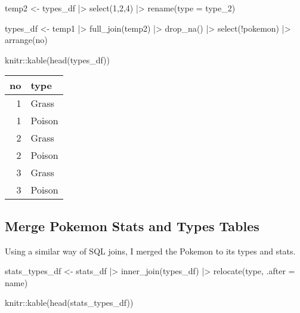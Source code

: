 \documentclass[
]{article}
\newenvironment{Shaded}{\begin{snugshade}}{\end{snugshade}}
\newcommand{\AttributeTok}[1]{\textcolor[rgb]{0.77,0.63,0.00}{#1}}
\newcommand{\DecValTok}[1]{\textcolor[rgb]{0.00,0.00,0.81}{#1}}
\newcommand{\FunctionTok}[1]{\textcolor[rgb]{0.00,0.00,0.00}{#1}}
\newcommand{\NormalTok}[1]{#1}
\newcommand{\OtherTok}[1]{\textcolor[rgb]{0.56,0.35,0.01}{#1}}
\newcommand{\SpecialCharTok}[1]{\textcolor[rgb]{0.00,0.00,0.00}{#1}}
\begin{document}
\begin{Shaded}
\begin{Highlighting}[]
\NormalTok{temp2 }\OtherTok{\textless{}{-}} 
\NormalTok{  types\_df }\SpecialCharTok{|\textgreater{}} 
  \FunctionTok{select}\NormalTok{(}\DecValTok{1}\NormalTok{,}\DecValTok{2}\NormalTok{,}\DecValTok{4}\NormalTok{) }\SpecialCharTok{|\textgreater{}} 
  \FunctionTok{rename}\NormalTok{(}\AttributeTok{type =}\NormalTok{ type\_2)}

\NormalTok{types\_df }\OtherTok{\textless{}{-}} 
\NormalTok{  temp1 }\SpecialCharTok{|\textgreater{}} 
  \FunctionTok{full\_join}\NormalTok{(temp2) }\SpecialCharTok{|\textgreater{}}
  \FunctionTok{drop\_na}\NormalTok{() }\SpecialCharTok{|\textgreater{}} 
  \FunctionTok{select}\NormalTok{(}\SpecialCharTok{!}\NormalTok{pokemon) }\SpecialCharTok{|\textgreater{}} 
  \FunctionTok{arrange}\NormalTok{(no)}

\NormalTok{knitr}\SpecialCharTok{::}\FunctionTok{kable}\NormalTok{(}\FunctionTok{head}\NormalTok{(types\_df))}
\end{Highlighting}
\end{Shaded}

\begin{longtable}[]{@{}rl@{}}
\toprule()
no & type \\
\midrule()
\endhead
1 & Grass \\
1 & Poison \\
2 & Grass \\
2 & Poison \\
3 & Grass \\
3 & Poison \\
\bottomrule()
\end{longtable}

\hypertarget{merge-pokemon-stats-and-types-tables}{%
\subsection{Merge Pokemon Stats and Types
Tables}\label{merge-pokemon-stats-and-types-tables}}

Using a similar way of SQL joins, I merged the Pokemon to its types and
stats.

\begin{Shaded}
\begin{Highlighting}[]
\NormalTok{stats\_types\_df }\OtherTok{\textless{}{-}}  
\NormalTok{  stats\_df }\SpecialCharTok{|\textgreater{}} 
  \FunctionTok{inner\_join}\NormalTok{(types\_df) }\SpecialCharTok{|\textgreater{}} 
  \FunctionTok{relocate}\NormalTok{(type, }\AttributeTok{.after =}\NormalTok{ name)}

\NormalTok{knitr}\SpecialCharTok{::}\FunctionTok{kable}\NormalTok{(}\FunctionTok{head}\NormalTok{(stats\_types\_df))}
\end{Highlighting}
\end{Shaded}
\end{document}
